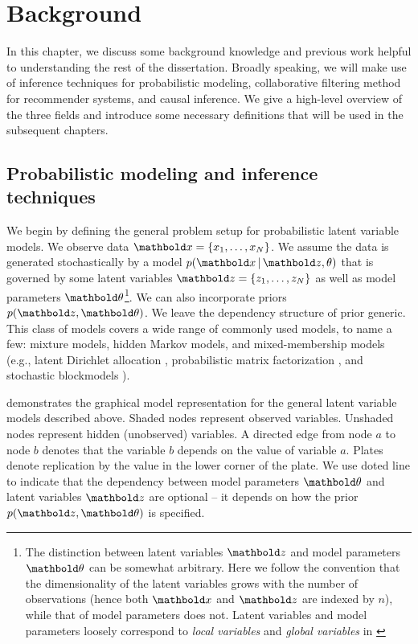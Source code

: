 

\chapter{Background}\label{chpt:background}

In this chapter, we discuss some background knowledge and previous work helpful to understanding the rest of the dissertation. 
Broadly speaking, we will make use of inference techniques for probabilistic modeling, collaborative filtering method for recommender systems, and causal inference. We give a high-level overview of the three fields and introduce some necessary definitions that will be used in the subsequent chapters. 

\section{Probabilistic modeling and inference techniques}\label{chpt:background:sec:inference}

We begin by defining the general problem setup for probabilistic latent variable models. We observe data $\mbx = \{x_1, \dots, x_N\}$. We assume the data is generated stochastically by a model $p(\mbx \g \mbz, \theta)$ that is governed by some latent variables $\mbz = \{z_1, \dots, z_N\}$ as well as model parameters $\mb\theta$\footnote{The distinction between latent variables $\mbz$ and model parameters $\mb\theta$ can be somewhat arbitrary. Here we follow the convention that the dimensionality of the latent variables grows with the number of observations (hence both $\mbx$ and $\mbz$ are indexed by $n$), while that of model parameters does not. Latent variables and model parameters loosely correspond to \textit{local variables} and \textit{global variables} in \citet{hoffman2013stochastic}}. We can also incorporate priors $p(\mbz, \mb\theta)$. We leave the dependency structure of prior generic. This class of models covers a wide range of commonly used models, to name a few: mixture models, hidden Markov models, and mixed-membership models (e.g., latent Dirichlet allocation \citep{blei2003latent}, probabilistic matrix factorization \citep{salakhutdinov2007probabilistic}, and stochastic blockmodels \citep{DBLP:journals/jmlr/AiroldiBFX08}).

 demonstrates the graphical model representation for the general latent variable models described above. Shaded nodes represent observed variables. Unshaded nodes represent
hidden (unobserved) variables. A directed edge from node $a$ to node $b$
denotes that the variable $b$ depends on the value of variable
$a$. Plates denote replication by the value in the lower corner
of the plate. We use doted line to indicate that the dependency between model parameters $\mb\theta$ and latent variables $\mbz$ are optional -- it depends on how the prior $p(\mbz, \mb\theta)$ is specified. 

